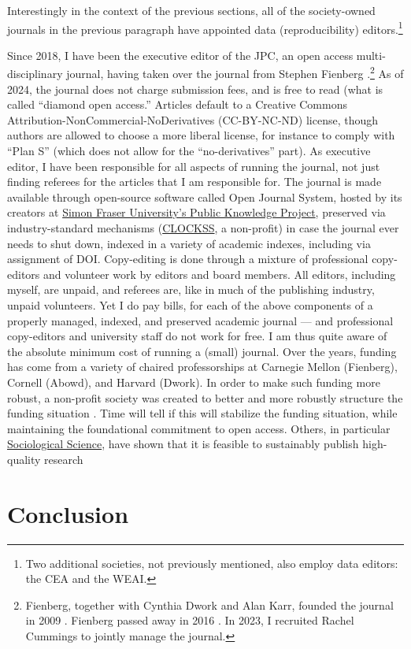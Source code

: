 \documentclass{article}
\begin{document}
Interestingly in the context of the previous sections, all of the society-owned journals in the previous paragraph have appointed  data (reproducibility) editors.\footnote{Two additional societies, not previously mentioned, also employ data editors: the \ac{CEA} and the \ac{WEAI}. }

Since 2018, I have been the executive editor of the \ac{JPC}, an open access multi-disciplinary journal, having taken over the journal from Stephen Fienberg \citep{vilhuber_relaunching_2018}.\footnote{Fienberg, together with Cynthia Dwork and Alan Karr, founded the journal in 2009 \citep{abowd_first_2009}. Fienberg passed away in 2016 \citep{slavkovic_remembering_2018}.  In 2023, I recruited Rachel Cummings to jointly manage the journal.} As of 2024, the journal does not charge submission fees, and is free to read (what is called ``diamond open access.'' Articles default to a Creative Commons Attribution-NonCommercial-NoDerivatives (CC-BY-NC-ND) license, though authors are allowed to choose a more liberal license, for instance to comply with ``Plan S'' (which does not allow for the ``no-derivatives'' part). As executive editor, I have been responsible for all aspects of running the journal, not just finding referees for the articles that I am responsible for. The journal is made available through open-source software called Open Journal System, hosted by its creators at \href{https://pkp.sfu.ca/hosting-services/hosting/journals/}{Simon Fraser University's Public Knowledge Project}, preserved via industry-standard mechanisms (\href{https://clockss.org/about/how-clockss-works/}{CLOCKSS}, a non-profit) in case the journal ever needs to shut down, indexed in a variety of academic indexes, including via assignment of \acs{DOI}. Copy-editing is done through a mixture of professional copy-editors and volunteer work by editors and board members. All editors, including myself, are unpaid, and referees are, like in much of the publishing industry, unpaid volunteers. Yet I do pay bills, for each of the above components of a properly managed, indexed, and preserved academic journal --- and professional copy-editors and university staff do not work for free. I am thus quite aware of the absolute minimum cost of running a (small) journal. Over the years, funding has come from a variety of chaired professorships at Carnegie Mellon (Fienberg), Cornell (Abowd), and Harvard (Dwork). In order to make such funding more robust, a non-profit society was created to better and more robustly structure the funding situation \citep{abowd_launching_2024}. Time will tell if this will stabilize the funding situation, while maintaining the foundational commitment to open access. Others, in particular \href{https://sociologicalscience.com/}{Sociological Science}, have shown that it is feasible to sustainably publish high-quality research 


\section{Conclusion}

\printbibliography[title={References}]
\end{document}
